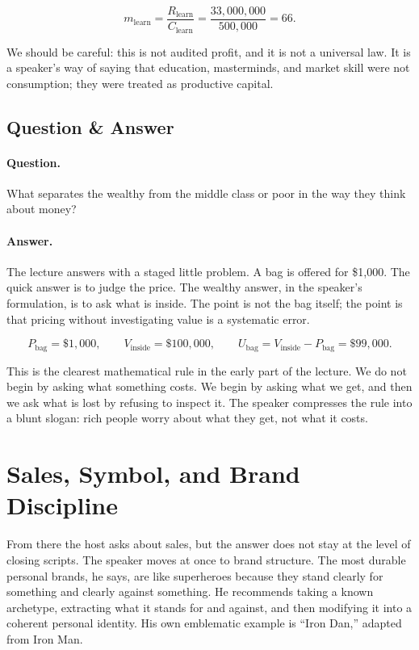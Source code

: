 \begin{equation}
m_{\text{learn}}
=
\frac{R_{\text{learn}}}{C_{\text{learn}}}
=
\frac{33{,}000{,}000}{500{,}000}
=
66.
\end{equation}

We should be careful: this is not audited profit, and it is not a universal law. It is a speaker's way of saying that education, masterminds, and market skill were not consumption; they were treated as productive capital.

\subsection{Question \& Answer}

\paragraph{Question.} What separates the wealthy from the middle class or poor in the way they think about money?

\paragraph{Answer.} The lecture answers with a staged little problem. A bag is offered for \$1{,}000. The quick answer is to judge the price. The wealthy answer, in the speaker's formulation, is to ask what is inside. The point is not the bag itself; the point is that pricing without investigating value is a systematic error.

\begin{equation}
P_{\text{bag}}=\$1{,}000,
\qquad
V_{\text{inside}}=\$100{,}000,
\qquad
U_{\text{bag}}=V_{\text{inside}}-P_{\text{bag}}=\$99{,}000.
\end{equation}

This is the clearest mathematical rule in the early part of the lecture. We do not begin by asking what something costs. We begin by asking what we get, and then we ask what is lost by refusing to inspect it. The speaker compresses the rule into a blunt slogan: rich people worry about what they get, not what it costs.

\section{Sales, Symbol, and Brand Discipline}

From there the host asks about sales, but the answer does not stay at the level of closing scripts. The speaker moves at once to brand structure. The most durable personal brands, he says, are like superheroes because they stand clearly for something and clearly against something. He recommends taking a known archetype, extracting what it stands for and against, and then modifying it into a coherent personal identity. His own emblematic example is ``Iron Dan,'' adapted from Iron Man.

